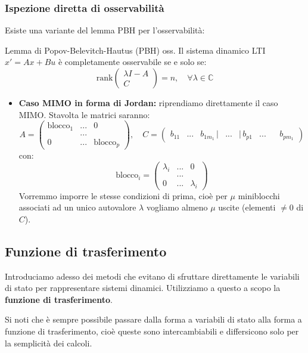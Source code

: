\documentclass[a4paper,11pt]{article}
\begin{document}
\subsubsection{Ispezione diretta di osservabilità}
Esiste una variante del lemma PBH per l'osservabilità:
		\begin{theorem}{Lemma di Popov-Belevitch-Hautus (PBH) oss.}
			Il sistema dinamico LTI $x' = Ax + Bu$ è completamente osservabile se e solo se: $$\mathrm{rank}\begin{pmatrix}
			\lambda I - A \\ C
			\end{pmatrix} = n, \quad \forall \lambda \in \mathbb{C}$$
		\end{theorem}
		
		\begin{itemize}
			\item \textbf{Caso MIMO in forma di Jordan:} riprendiamo direttamente il caso MIMO. Stavolta le matrici saranno:
		$$
			A = \begin{pmatrix}
				\text{blocco}_1 & ... & 0 \\
												& ... & \\
				0 & ... & \text{blocco}_p
			\end{pmatrix}, \quad C = \begin{pmatrix}
				b_{11} & ... & b_{1m_1} \, | & ... & | \, b_{p1} & ... &&b_{pm_1}
			\end{pmatrix}
		$$
		con:
		$$
			\text{blocco}_i = \begin{pmatrix}
				\lambda_i & ... & 0 \\
				& ... & \\ 
				0 & ... & \lambda_i
			\end{pmatrix}
		$$
		Vorremmo imporre le stesse condizioni di prima, cioè per $\mu$ miniblocchi associati ad un unico autovalore $\lambda$ vogliamo almeno $\mu$ uscite (elementi $\neq 0$ di $C$).

		\end{itemize}

\subsection{Funzione di trasferimento}
Introduciamo adesso dei metodi che evitano di sfruttare direttamente le variabili di stato per rappresentare sistemi dinamici.
Utilizziamo a questo a scopo la \textbf{funzione di trasferimento}.

Si noti che è sempre possibile passare dalla forma a variabili di stato alla forma a funzione di trasferimento, cioè queste sono intercambiabili e differsicono solo per la semplicità dei calcoli.
\end{document}
